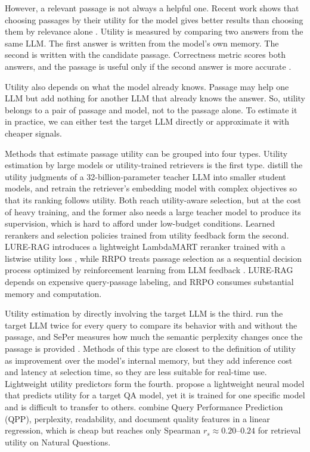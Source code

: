 \documentclass[preprint,12pt,authoryear]{elsarticle}
\begin{document}
However, a relevant passage is not always a helpful one. Recent work shows that choosing passages by their utility for the model gives better results than choosing them by relevance alone \citep{zhang2026}. Utility is measured by comparing two answers from the same LLM. The first answer is written from the model’s own memory. The second is written with the candidate passage. Correctness metric scores both answers, and the passage is useful only if the second answer is more accurate \citep{zhang2026}.

Utility also depends on what the model already knows. Passage may help one LLM but add nothing for another LLM that already knows the answer. So, utility belongs to a pair of passage and model, not to the passage alone. To estimate it in practice, we can either test the target LLM directly or approximate it with cheaper signals.

Methods that estimate passage utility can be grouped into four types. Utility estimation by large models or utility-trained retrievers is the first type. \citet{zhang2025b} distill the utility judgments of a 32-billion-parameter teacher LLM into smaller student models, and \citet{sandhu2026} retrain the retriever’s embedding model with complex objectives so that its ranking follows utility. Both reach utility-aware selection, but at the cost of heavy training, and the former also needs a large teacher model to produce its supervision, which is hard to afford under low-budget conditions. Learned rerankers and selection policies trained from utility feedback form the second. LURE-RAG introduces a lightweight LambdaMART reranker trained with a listwise utility loss \citep{chandra2026}, while RRPO treats passage selection as a sequential decision process optimized by reinforcement learning from LLM feedback \citep{wu2026}. LURE-RAG depends on expensive query-passage labeling, and RRPO consumes substantial memory and computation.

Utility estimation by directly involving the target LLM is the third. \citet{zhang2025c} run the target LLM twice for every query to compare its behavior with and without the passage, and SePer measures how much the semantic perplexity changes once the passage is provided \citep{dai2025}. Methods of this type are closest to the definition of utility as improvement over the model’s internal memory, but they add inference cost and latency at selection time, so they are less suitable for real-time use. Lightweight utility predictors form the fourth. \citet{perez2025} propose a lightweight neural model that predicts utility for a target QA model, yet it is trained for one specific model and is difficult to transfer to others. \citet{tian2026} combine Query Performance Prediction (QPP), perplexity, readability, and document quality features in a linear regression, which is cheap but reaches only Spearman $r_s \approx 0.20$--$0.24$ for retrieval utility on Natural Questions.
\end{document}

